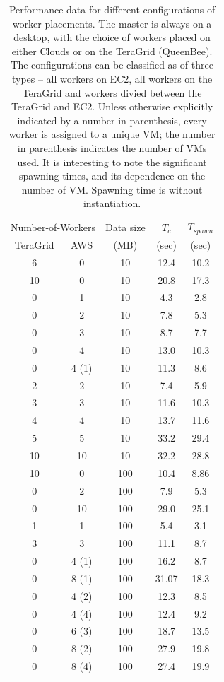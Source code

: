 \documentclass[conference,final]{IEEEtran}
\newcommand{\upp}{\vspace*{-0.5em}}
\begin{document}
\begin{table}
\upp
\begin{tabular}{ccccc}
  \hline
  \multicolumn{2}{c}{Number-of-Workers}  &  Data size   &  $T_c$  & $T_{spawn}$ \\   
  TeraGrid &  AWS &   (MB)  & (sec) & (sec)  \\
  \hline
  6 & 0 & 10  &  12.4 &  10.2 \\
  10 & 0 & 10  & 20.8 & 17.3 \\  
  \hline 
  0 & 1 & 10 & 4.3 & 2.8 \\
  0 & 2 & 10 & 7.8 & 5.3 \\ 
  0 & 3 & 10 & 8.7 & 7.7 \\
  0 & 4 & 10 & 13.0 & 10.3 \\
  0 & 4 (1) & 10 &  11.3 & 8.6 \\
  \hline 
  2 & 2 & 10 & 7.4 & 5.9 \\
  3 & 3 & 10 & 11.6 & 10.3 \\
  4 & 4 & 10 & 13.7 & 11.6 \\
  5 & 5 & 10 & 33.2 & 29.4 \\ 
  10 & 10 & 10 & 32.2 & 28.8 \\
  \hline
  \hline 
  10 & 0 & 100 & 10.4 & 8.86 \\
  0 & 2 & 100 & 7.9 & 5.3 \\
  0 & 10 & 100 &  29.0 & 25.1 \\
  1 & 1 & 100 & 5.4 & 3.1 \\
  3 & 3 & 100 & 11.1 & 8.7 \\
  \hline \hline
  0 & 4 (1) & 100 & 16.2 & 8.7 \\ 
  0 & 8 (1) & 100 & 31.07 & 18.3\\
  0 & 4 (2) & 100 & 12.3 & 8.5 \\
  0 & 4 (4) & 100 & 12.4 & 9.2 \\
  0 & 6 (3) & 100 & 18.7 & 13.5 \\
  0 & 8 (2) & 100 & 27.9 & 19.8 \\
  0 & 8 (4) & 100 & 27.4 & 19.9 \\
  \hline \hline
\end{tabular}
\upp
\caption{Performance data for different configurations of worker placements. The master is always on a desktop, with the choice of workers placed on either Clouds or on the TeraGrid (QueenBee). The configurations can be classified as of three types -- all workers on EC2, all workers on the TeraGrid and workers divied between the TeraGrid and EC2. Unless otherwise explicitly indicated
  by a number in parenthesis, every worker is assigned to a unique VM; the number  in parenthesis indicates the number of VMs used. It is interesting to note the significant spawning times, and its dependence on the number of VM. Spawning time is without instantiation.}
\label{stuff}
\upp
\upp
\end{table}
\end{document}
